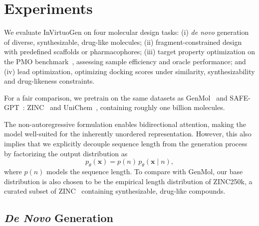 \documentclass{article} %
\begin{document}
\section{Experiments}
We evaluate InVirtuoGen on four molecular design tasks: (i) \textit{de novo} generation of diverse, synthesizable, drug-like molecules; (ii) fragment-constrained design with predefined scaffolds or pharmacophores; (iii) target property optimization on the PMO benchmark~\citep{gao2022sampleefficiencymattersbenchmark}, assessing sample efficiency and oracle performance; and (iv) lead optimization, optimizing docking scores under similarity, synthesizability and drug-likeness constraints.

For a fair comparison, we pretrain on the same datasets as GenMol~\citep{genmol} and SAFE-GPT~\citep{elmesbahi2024safe_setup}: ZINC~\citep{zinc} and UniChem~\citep{unichem}, containing roughly one billion molecules.

The non-autoregressive formulation enables bidirectional attention, making the model well-suited for the inherently unordered representation. However, this also implies that we explicitly decouple sequence length from the generation process by factorizing the output distribution as
\begin{equation}
    p_\theta(\mathbf{x}) = p(n)\, p_\theta(\mathbf{x} \mid n),
\end{equation}
where $p(n)$ models the sequence length. To compare with GenMol, our base distribution is also chosen to be the empirical length distribution of ZINC250k, a curated subset of ZINC~\citep{zinc} containing synthesizable, drug-like compounds.

\subsection{\textit{De Novo} Generation}
\end{document}

